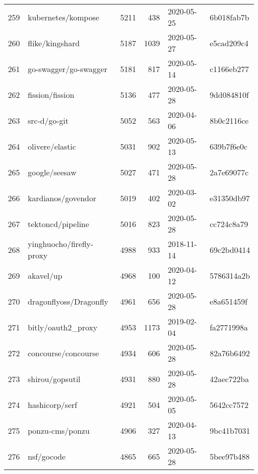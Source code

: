 \begin{longtable}{llrrll}
    259 &                                 kubernetes/kompose &   5211 &    438 & 2020-05-25 &  6b018fab7b \\
    260 &                                    flike/kingshard &   5187 &   1039 & 2020-05-27 &  e5cad209c4 \\
    261 &                              go-swagger/go-swagger &   5181 &    817 & 2020-05-14 &  c1166eb277 \\
    262 &                                    fission/fission &   5136 &    477 & 2020-05-28 &  9dd084810f \\
    263 &                                       src-d/go-git &   5052 &    563 & 2020-04-06 &  8b0c2116ce \\
    264 &                                    olivere/elastic &   5031 &    902 & 2020-05-13 &  639b7f6e0c \\
    265 &                                      google/seesaw &   5027 &    471 & 2020-05-28 &  2a7e69077c \\
    266 &                                 kardianos/govendor &   5019 &    402 & 2020-03-02 &  e31350db97 \\
    267 &                                  tektoncd/pipeline &   5016 &    823 & 2020-05-28 &  cc724c8a79 \\
    268 &                           yinghuocho/firefly-proxy &   4988 &    933 & 2018-11-14 &  69c2bd0414 \\
    269 &                                          akavel/up &   4968 &    100 & 2020-04-12 &  5786314a2b \\
    270 &                             dragonflyoss/Dragonfly &   4961 &    656 & 2020-05-28 &  e8a651459f \\
    271 &                                 bitly/oauth2\_proxy &   4953 &   1173 & 2019-02-04 &  fa2771998a \\
    272 &                                concourse/concourse &   4934 &    606 & 2020-05-28 &  82a76b6492 \\
    273 &                                    shirou/gopsutil &   4931 &    880 & 2020-05-28 &  42aec722ba \\
    274 &                                     hashicorp/serf &   4921 &    504 & 2020-05-05 &  5642cc7572 \\
    275 &                                    ponzu-cms/ponzu &   4906 &    327 & 2020-04-13 &  9bc41b7031 \\
    276 &                                         nsf/gocode &   4865 &    665 & 2020-05-28 &  5bee97b488 \\

\end{longtable}
